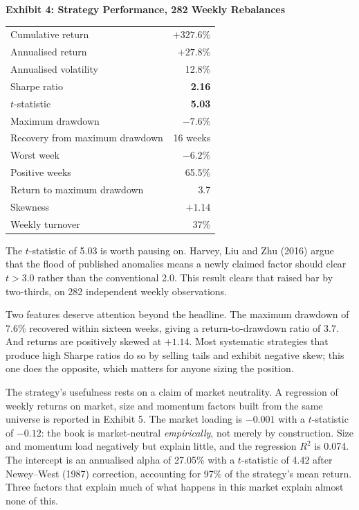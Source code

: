 \documentclass[12pt]{article}
\newenvironment{exhibit}[2]{%
  \par\vspace{14pt}\noindent\begin{minipage}{\textwidth}\centering\small
  \textbf{Exhibit #1: #2}\par\vspace{6pt}}%
  {\end{minipage}\par\vspace{12pt}}
\begin{document}
\begin{exhibit}{4}{Strategy Performance, 282 Weekly Rebalances}
\begin{tabular}{lr}
\toprule
Cumulative return & $+327.6\%$ \\
Annualised return & $+27.8\%$ \\
Annualised volatility & 12.8\% \\
Sharpe ratio & \textbf{2.16} \\
$t$-statistic & \textbf{5.03} \\
Maximum drawdown & \textbf{$-7.6\%$} \\
Recovery from maximum drawdown & 16 weeks \\
Worst week & $-6.2\%$ \\
Positive weeks & 65.5\% \\
Return to maximum drawdown & 3.7 \\
Skewness & $+1.14$ \\
Weekly turnover & 37\% \\
\bottomrule
\end{tabular}
\end{exhibit}

The $t$-statistic of 5.03 is worth pausing on. Harvey, Liu and Zhu (2016) argue
that the flood of published anomalies means a newly claimed factor should clear
$t>3.0$ rather than the conventional 2.0. This result clears that raised bar by
two-thirds, on 282 independent weekly observations.

Two features deserve attention beyond the headline. The maximum drawdown of 7.6\%
recovered within sixteen weeks, giving a return-to-drawdown ratio of 3.7. And
returns are positively skewed at $+1.14$. Most systematic strategies that produce
high Sharpe ratios do so by selling tails and exhibit negative skew; this one does
the opposite, which matters for anyone sizing the position.

The strategy's usefulness rests on a claim of market neutrality. A regression of
weekly returns on market, size and momentum factors built from the same universe
is reported in Exhibit 5. The market loading is $-0.001$ with a $t$-statistic of
$-0.12$: the book is market-neutral \emph{empirically}, not merely by
construction. Size and momentum load negatively but explain little, and the
regression $R^2$ is 0.074. The intercept is an annualised alpha of 27.05\% with a
$t$-statistic of 4.42 after Newey--West (1987) correction, accounting for 97\% of
the strategy's mean return. Three factors that explain much of what happens in
this market explain almost none of this.
\end{document}
